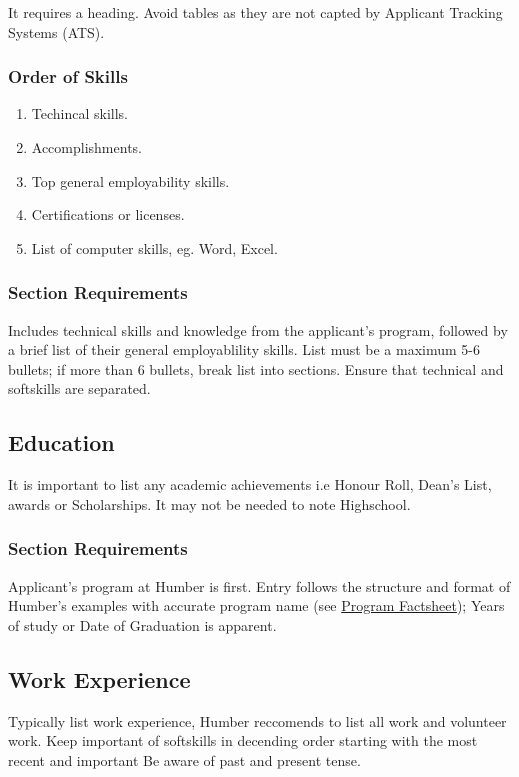 \documentclass{report}
\begin{document}
	It requires a heading. Avoid tables as they are not capted by Applicant Tracking Systems (ATS).

	\subsubsection*{Order of Skills}

	\begin{enumerate}
		\item Techincal skills.
		\item Accomplishments.
		\item Top general employability skills.
		\item Certifications or licenses.
		\item List of computer skills, eg. Word, Excel.
	\end{enumerate}

	\subsubsection*{Section Requirements}
	Includes technical skills and knowledge from the applicant's program, followed by a brief list of their general employablility skills. 
	List must be a maximum 5-6 bullets; if more than 6 bullets, break list into sections. 
	Ensure that technical and softskills are separated.

	\subsection{Education}
    	\label{sec:education} %
	It is important to list any academic achievements i.e Honour Roll, Dean's List, awards or Scholarships. It may not be needed to note Highschool.

	\subsubsection*{Section Requirements}
	Applicant's program at Humber is first. Entry follows the structure and format of Humber's examples with accurate program name (see \hyperref[sec:factsheet]{Program Factsheet}); Years of study or Date of Graduation is apparent.

	\subsection{Work Experience}
    	\label{sec:workExp} %
	Typically list work experience, Humber reccomends to list all work and volunteer work.
	Keep important of softskills in decending order starting with the most recent and important
	Be aware of past and present tense.
\end{document}
